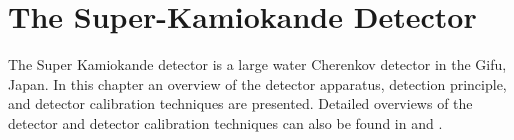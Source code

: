 \chapter{The Super-Kamiokande Detector}
\label{ch:SK_detector}
\graphicspath{{sk_detector/}}
The Super Kamiokande detector is a large water Cherenkov detector in the Gifu, Japan.  In this chapter an overview of the detector apparatus, detection principle, and detector calibration techniques are presented.  Detailed overviews of the detector and detector calibration techniques can also be found in \cite{Fukuda:2002uc} and \cite{Abe:2013gga}.






